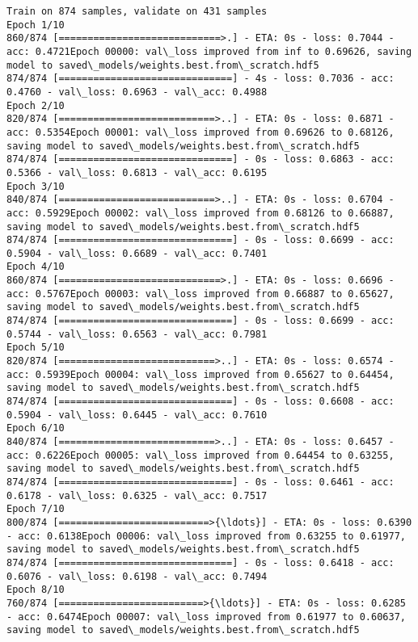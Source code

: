 \documentclass[11pt]{article}
\begin{document}
    \begin{Verbatim}[commandchars=\\\{\}]
Train on 874 samples, validate on 431 samples
Epoch 1/10
860/874 [============================>.] - ETA: 0s - loss: 0.7044 - acc: 0.4721Epoch 00000: val\_loss improved from inf to 0.69626, saving model to saved\_models/weights.best.from\_scratch.hdf5
874/874 [==============================] - 4s - loss: 0.7036 - acc: 0.4760 - val\_loss: 0.6963 - val\_acc: 0.4988
Epoch 2/10
820/874 [===========================>..] - ETA: 0s - loss: 0.6871 - acc: 0.5354Epoch 00001: val\_loss improved from 0.69626 to 0.68126, saving model to saved\_models/weights.best.from\_scratch.hdf5
874/874 [==============================] - 0s - loss: 0.6863 - acc: 0.5366 - val\_loss: 0.6813 - val\_acc: 0.6195
Epoch 3/10
840/874 [===========================>..] - ETA: 0s - loss: 0.6704 - acc: 0.5929Epoch 00002: val\_loss improved from 0.68126 to 0.66887, saving model to saved\_models/weights.best.from\_scratch.hdf5
874/874 [==============================] - 0s - loss: 0.6699 - acc: 0.5904 - val\_loss: 0.6689 - val\_acc: 0.7401
Epoch 4/10
860/874 [============================>.] - ETA: 0s - loss: 0.6696 - acc: 0.5767Epoch 00003: val\_loss improved from 0.66887 to 0.65627, saving model to saved\_models/weights.best.from\_scratch.hdf5
874/874 [==============================] - 0s - loss: 0.6699 - acc: 0.5744 - val\_loss: 0.6563 - val\_acc: 0.7981
Epoch 5/10
820/874 [===========================>..] - ETA: 0s - loss: 0.6574 - acc: 0.5939Epoch 00004: val\_loss improved from 0.65627 to 0.64454, saving model to saved\_models/weights.best.from\_scratch.hdf5
874/874 [==============================] - 0s - loss: 0.6608 - acc: 0.5904 - val\_loss: 0.6445 - val\_acc: 0.7610
Epoch 6/10
840/874 [===========================>..] - ETA: 0s - loss: 0.6457 - acc: 0.6226Epoch 00005: val\_loss improved from 0.64454 to 0.63255, saving model to saved\_models/weights.best.from\_scratch.hdf5
874/874 [==============================] - 0s - loss: 0.6461 - acc: 0.6178 - val\_loss: 0.6325 - val\_acc: 0.7517
Epoch 7/10
800/874 [==========================>{\ldots}] - ETA: 0s - loss: 0.6390 - acc: 0.6138Epoch 00006: val\_loss improved from 0.63255 to 0.61977, saving model to saved\_models/weights.best.from\_scratch.hdf5
874/874 [==============================] - 0s - loss: 0.6418 - acc: 0.6076 - val\_loss: 0.6198 - val\_acc: 0.7494
Epoch 8/10
760/874 [=========================>{\ldots}] - ETA: 0s - loss: 0.6285 - acc: 0.6474Epoch 00007: val\_loss improved from 0.61977 to 0.60637, saving model to saved\_models/weights.best.from\_scratch.hdf5

\end{Verbatim}
\end{document}
